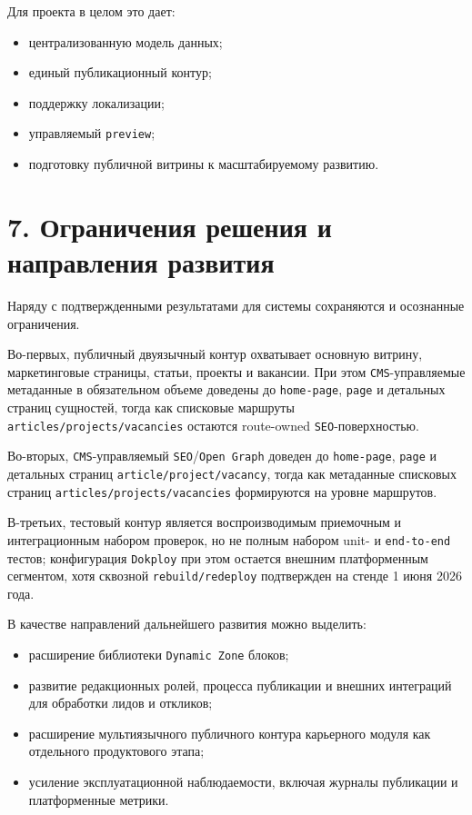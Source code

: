 \documentclass[12pt,a4paper]{article}
\begin{document}
Для проекта в целом это дает:
\begin{itemize}
  \item централизованную модель данных;
  \item единый публикационный контур;
  \item поддержку локализации;
  \item управляемый \texttt{preview};
  \item подготовку публичной витрины к масштабируемому развитию.
\end{itemize}

\section*{7. Ограничения решения и направления развития}

Наряду с подтвержденными результатами для системы сохраняются и осознанные ограничения.

Во-первых, публичный двуязычный контур охватывает основную витрину, маркетинговые
страницы, статьи, проекты и вакансии. При этом \texttt{CMS}-управляемые метаданные в
обязательном объеме доведены до \texttt{home-page}, \texttt{page} и детальных страниц
сущностей, тогда как списковые маршруты \texttt{articles/projects/vacancies} остаются
route-owned \texttt{SEO}-поверхностью.

Во-вторых, \texttt{CMS}-управляемый \texttt{SEO}/\texttt{Open Graph} доведен до
\texttt{home-page}, \texttt{page} и детальных страниц \texttt{article/project/vacancy},
тогда как метаданные списковых страниц \texttt{articles/projects/vacancies} формируются
на уровне маршрутов.

В-третьих, тестовый контур является воспроизводимым приемочным и интеграционным набором
проверок, но не полным набором unit- и \texttt{end-to-end} тестов; конфигурация
\texttt{Dokploy} при этом остается внешним платформенным сегментом, хотя сквозной \texttt{rebuild/redeploy}
подтвержден на стенде 1 июня 2026 года.

В качестве направлений дальнейшего развития можно выделить:
\begin{itemize}
  \item расширение библиотеки \texttt{Dynamic Zone} блоков;
  \item развитие редакционных ролей, процесса публикации и внешних интеграций для
  обработки лидов и откликов;
  \item расширение мультиязычного публичного контура карьерного модуля как отдельного
  продуктового этапа;
  \item усиление эксплуатационной наблюдаемости, включая журналы публикации и
  платформенные метрики.
\end{itemize}
\end{document}
